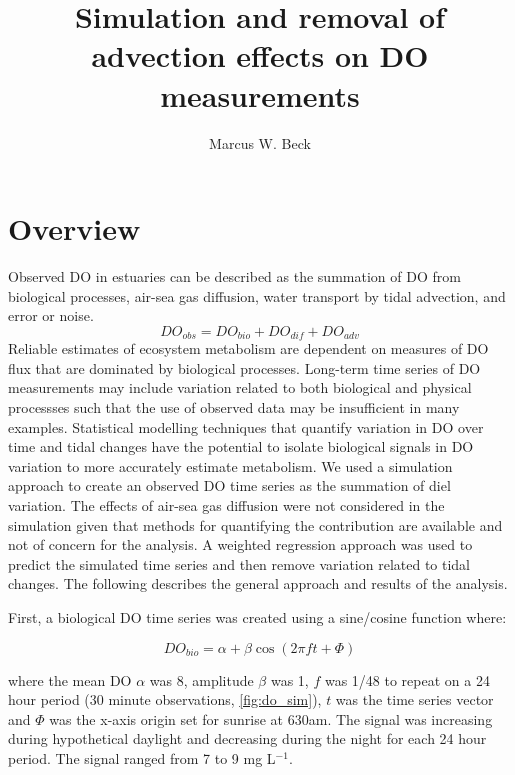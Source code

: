 \documentclass{article}\usepackage[]{graphicx}\usepackage[]{color}
\begin{document}
\setlength{\parskip}{5mm}
\setlength{\parindent}{0in}

\title{Simulation and removal of advection effects on DO measurements}
\author{Marcus W. Beck}
\maketitle

\section{Overview}

Observed DO in estuaries can be described as the summation of DO from biological processes, air-sea gas diffusion, water transport by tidal advection, and error or noise.  
\begin{equation} \label{eqn:one}
DO_{obs} = DO_{bio} + DO_{dif} + DO_{adv}
\end{equation}
Reliable estimates of ecosystem metabolism are dependent on measures of DO flux that are dominated by biological processes.  Long-term time series of DO measurements may include variation related to both biological and physical processses such that the use of observed data may be insufficient in many examples.  Statistical modelling techniques that quantify variation in DO over time and tidal changes have the potential to isolate biological signals in DO variation to more accurately estimate metabolism.  We used a simulation approach to create an observed DO time series as the summation of diel variation.  The effects of air-sea gas diffusion were not considered in the simulation given that methods for quantifying the contribution are available and not of concern for the analysis.  A weighted regression approach was used to predict the simulated time series and then remove variation related to tidal changes.  The following describes the general approach and results of the analysis.

First, a biological DO time series was created using a sine/cosine function where:

\begin{equation} \label{eqn:bio}
DO_{bio} = \alpha + \beta\cos\left(2\pi ft + \Phi\right)
\end{equation}

where the mean DO $\alpha$ was 8, amplitude $\beta$ was 1, $f$ was 1/48 to repeat on a 24 hour period (30 minute observations, \cref{fig:do_sim}), $t$ was the time series vector and $\Phi$ was the x-axis origin set for sunrise at 630am.  The signal was increasing during hypothetical daylight and decreasing during the night for each 24 hour period.  The signal ranged from 7 to 9 mg L$^{-1}$.
\end{document}
